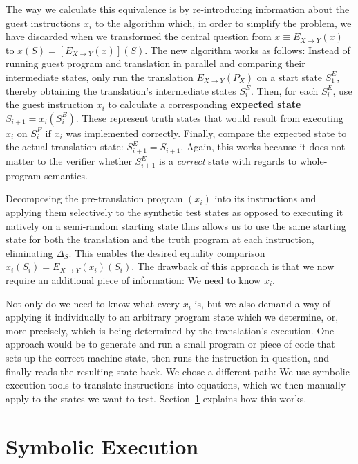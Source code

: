The way we calculate this equivalence is by re-introducing information about the guest instructions $x_i$ to the
algorithm which, in order to simplify the problem, we have discarded when we transformed the central question from $x
\equiv E_{X \rightarrow Y}(x)$ to $x(S) = [E_{X \rightarrow Y}(x)](S)$. The new algorithm works as follows: Instead of
running guest program and translation in parallel and comparing their intermediate states, only run the translation
$E_{X \rightarrow Y}(P_X)$ on a start state $S^E_1$, thereby obtaining the translation's intermediate states $S^E_i$.
Then, for each $S^E_i$, use the guest instruction $x_i$ to calculate a corresponding \textbf{expected state} $S_{i+1} =
x_i(S^E_i)$. These represent truth states that would result from executing $x_i$ on $S^E_i$ if $x_i$ was implemented
correctly. Finally, compare the expected state to the actual translation state: $S^E_{i+1} = S_{i+1}$. Again, this works
because it does not matter to the verifier whether $S^E_{i+1}$ is a \textit{correct} state with regards to whole-program
semantics.

Decomposing the pre-translation program $(x_i)$ into its instructions and applying them selectively to the synthetic
test states as opposed to executing it natively on a semi-random starting state thus allows us to use the same starting
state for both the translation and the truth program at each instruction, eliminating $\Delta_S$. This enables the
desired equality comparison $x_i(S_i) = E_{X \rightarrow Y}(x_i)(S_i)$. The drawback of this approach is that we now
require an additional piece of information: We need to know $x_i$.

Not only do we need to know what every $x_i$ is, but we also demand a way of applying it individually to an arbitrary
program state which we determine, or, more precisely, which is being determined by the translation's execution. One
approach would be to generate and run a small program or piece of code that sets up the correct machine state, then runs
the instruction in question, and finally reads the resulting state back. We chose a different path: We use symbolic
execution tools to translate instructions into equations, which we then manually apply to the states we want to test.
Section~\ref{sec:symb_exec} explains how this works.

\section{Symbolic Execution}\label{sec:symb_exec}

